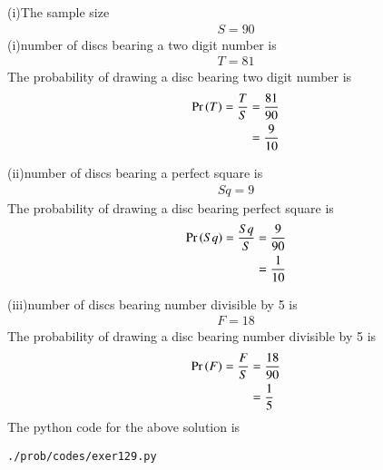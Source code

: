 (i)The sample size 
\begin{align}
S=90
\end{align}
(i)number of discs bearing a two digit number is 
\begin{align}
T=81
\end{align}
The probability of drawing a disc bearing two digit number is 
\begin{align}
\Pr\left(T\right) = \frac{T}{S} &= \frac{81}{90}
\\
&= \frac{9}{10}
\end{align}

(ii)number of discs bearing a perfect square is 
\begin{align}
Sq=9
\end{align}
The probability of drawing a disc bearing perfect square is 
\begin{align}
\Pr\left(Sq\right) = \frac{Sq}{S} &= \frac{9}{90}
\\
&= \frac{1}{10}
\end{align}

(iii)number of discs bearing number divisible by 5 is 
\begin{align}
F=18
\end{align}
The probability of drawing a disc bearing number divisible by 5 is 
\begin{align}
\Pr\left(F\right) = \frac{F}{S} &= \frac{18}{90}
\\
&= \frac{1}{5}
\end{align}
The python code for the above solution is
\begin{lstlisting}
./prob/codes/exer129.py
\end{lstlisting}
